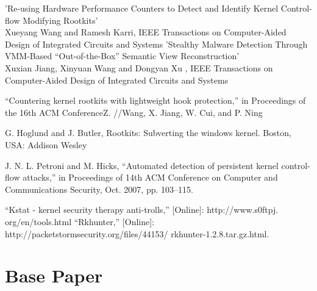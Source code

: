 \documentclass[12pt]{report}
\begin{document}
\begin{thebibliography}{999}

\bibitem{} 'Re-using Hardware Performance Counters to Detect
and Identify Kernel Control-flow Modifying
Rootkits' \\Xueyang Wang and  Ramesh Karri, IEEE Transactions on Computer-Aided Design of Integrated Circuits and Systems
\bibitem{} 'Stealthy Malware Detection Through VMM-Based
“Out-of-the-Box” Semantic View Reconstruction' \\Xuxian Jiang, Xinyuan Wang and Dongyan Xu , IEEE Transactions on Computer-Aided Design of Integrated Circuits and Systems

\bibitem{}“Countering kernel rootkits
with lightweight hook protection,” in Proceedings of the 16th ACM
ConferenceZ. //Wang, X. Jiang, W. Cui, and P. Ning 

\bibitem{}G. Hoglund and J. Butler, Rootkits: Subverting the windows kernel.
Boston, USA: Addison Wesley

\bibitem{}J. N. L. Petroni and M. Hicks, “Automated detection of persistent
kernel control-flow attacks,” in Proceedings of 14th ACM Conference
on Computer and Communications Security, Oct. 2007, pp. 103–115.

\bibitem{}“Kstat - kernel security therapy anti-trolls,” [Online]: http://www.s0ftpj.
org/en/tools.html
\bibitem{}“Rkhunter,” [Online]: http://packetstormsecurity.org/files/44153/
rkhunter-1.2.8.tar.gz.html.


\end{thebibliography}
\appendix{}
\cleardoublepage
{}
\setcounter{chapter}{-1}
\chapter{Base Paper}%
\end{document}
